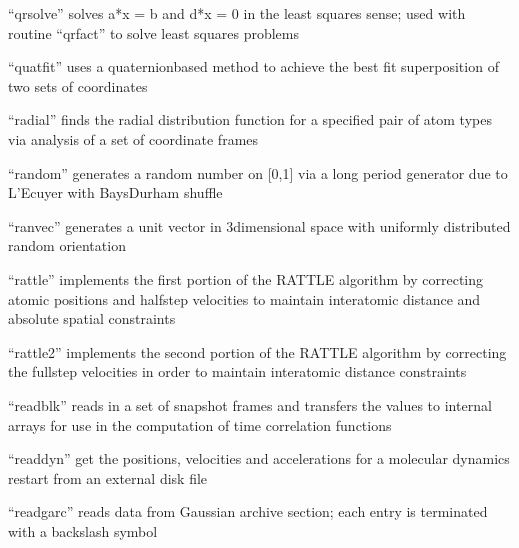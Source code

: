 \documentclass[letterpaper,11pt,english]{sphinxmanual}
\begin{document}

“qrsolve” solves a*x = b and d*x = 0 in the least squares sense;
used with routine “qrfact” to solve least squares problems


“quatfit” uses a quaternion\sphinxhyphen{}based method to achieve the best
fit superposition of two sets of coordinates


“radial” finds the radial distribution function for a specified
pair of atom types via analysis of a set of coordinate frames


“random” generates a random number on {[}0,1{]} via a long
period generator due to L’Ecuyer with Bays\sphinxhyphen{}Durham shuffle


“ranvec” generates a unit vector in 3\sphinxhyphen{}dimensional
space with uniformly distributed random orientation


“rattle” implements the first portion of the RATTLE algorithm
by correcting atomic positions and half\sphinxhyphen{}step velocities to
maintain interatomic distance and absolute spatial constraints


“rattle2” implements the second portion of the RATTLE algorithm
by correcting the full\sphinxhyphen{}step velocities in order to maintain
interatomic distance constraints


“readblk” reads in a set of snapshot frames and transfers
the values to internal arrays for use in the computation
of time correlation functions


“readdyn” get the positions, velocities and accelerations
for a molecular dynamics restart from an external disk file


“readgarc” reads data from Gaussian archive section; each
entry is terminated with a backslash symbol

\end{document}
